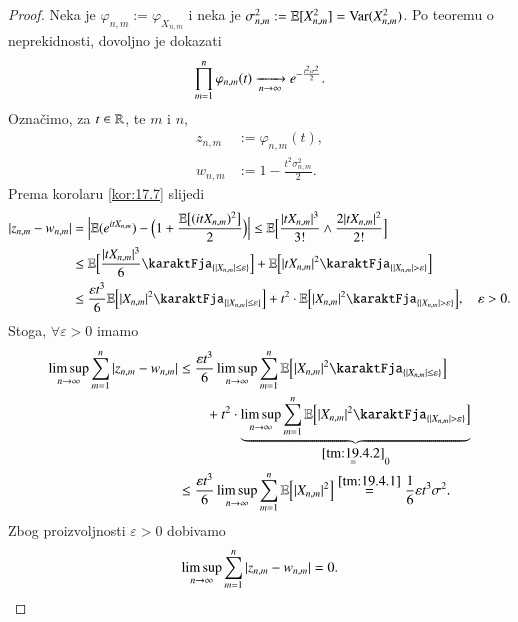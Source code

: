 \begin{proof}
    Neka je $\varphi_{n, m} := \varphi_{X_{n, m}}$ i neka je $\sigma^2_{n, m} := \mathbb{E} [X_{n, m}^2] = \mathrm{Var} (X_{n, m}^2)$.
    Po teoremu o neprekidnosti, dovoljno je dokazati
    \begin{equation*}
        \prod\limits_{m = 1}^{n} \varphi_{n, m} (t) \xrightarrow[n \to \infty]{} e^{-\frac{t^2 \sigma^2}{2}}.
    \end{equation*}
    Ozna\v cimo, za $t \in \mathbb{R}$, te $m$ i $n$,
    \begin{equation*}
        \begin{aligned}
            z_{n, m} &:= \varphi_{n, m} (t),\\
            w_{n, m} &:= 1 - \frac{t^2 \sigma_{n, m}^2}{2}.
        \end{aligned}
    \end{equation*}
    Prema korolaru \ref{kor:17.7} slijedi
    \begin{equation*}
        \begin{aligned}
            |z_{n, m} - w_{n, m}| &= \Big| \masE (e^{i t X_{n, m}}) - \Big( 1 + \frac{\masE \big[ (i t X_{n, m})^2 \big]}{2} \Big) \Big| \leq \masE \Big[ \frac{|t X_{n, m}|^3}{3!} \land \frac{2 |t X_{n, m}|^2}{2!} \Big]\\
            &\leq \masE \Big[ \frac{|t X_{n, m}|^3}{6} \karaktFja_{\{ |X_{n, m}| \leq \varepsilon \}} \Big] + \masE \Big[ |t X_{n, m}|^2 \karaktFja_{\{ |X_{n, m}| > \varepsilon \}} \Big]\\
            &\leq \frac{\varepsilon t^3}{6} \masE \Big[ |X_{n, m}|^2 \karaktFja_{\{ |X_{n, m}| \leq \varepsilon  \}} \Big] + t^2 \cdot \masE \Big[ |X_{n, m}|^2 \karaktFja_{\{ |X_{n, m}| > \varepsilon \}} \Big], \quad \varepsilon > 0.
        \end{aligned}
    \end{equation*}
    Stoga, $\forall \varepsilon > 0$ imamo
    \begin{equation*}
        \begin{aligned}
            \limsup\limits_{n \to \infty} \suma{m = 1}{n} |z_{n, m} - w_{n, m}| &\leq \frac{\varepsilon t^3}{6} \limsup\limits_{n \to \infty} \suma{m = 1}{n} \masE \Big[ |X_{n, m}|^2 \karaktFja_{\{ |X_{n, m}| \leq \varepsilon \}} \Big]\\
            &\quad \quad + t^2 \cdot \underbrace{\limsup\limits_{n \to \infty} \suma{m = 1}{n} \masE \Big[ |X_{n, m}|^2 \karaktFja_{\{|X_{n, m}| > \varepsilon \}} \Big]  }_{\overset{\ref{tm:19.4.2}}{=} 0}\\
            &\leq \frac{\varepsilon t^3}{6} \limsup\limits_{n \to \infty} \suma{m = 1}{n} \masE \Big[ |X_{n, m}|^2 \Big] \overset{\ref{tm:19.4.1}}{=} \frac{1}{6} \varepsilon t^3 \sigma^2.
        \end{aligned}
    \end{equation*}
    Zbog proizvoljnosti $\varepsilon > 0$ dobivamo
    \begin{equation}    \label{jed:19.5}
        \limsup\limits_{n \to \infty} \sum\limits_{m = 1}^{n} |z_{n, m} - w_{n, m}| = 0.
    \end{equation}


\end{proof}
